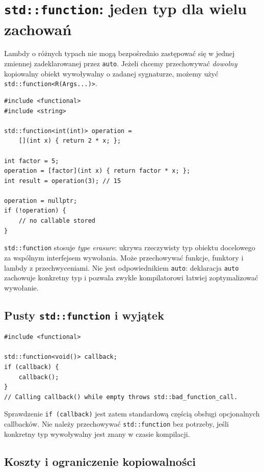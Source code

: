 \section{\texttt{std::function}: jeden typ dla wielu zachowań}
\label{sec:std-function}

Lambdy o różnych typach nie mogą bezpośrednio zastępować się w jednej
zmiennej zadeklarowanej przez \texttt{auto}. Jeżeli chcemy przechowywać
\emph{dowolny} kopiowalny obiekt wywoływalny o zadanej sygnaturze,
możemy użyć \texttt{std::function<R(Args...)>}.

\begin{lstlisting}
#include <functional>
#include <string>

std::function<int(int)> operation =
    [](int x) { return 2 * x; };

int factor = 5;
operation = [factor](int x) { return factor * x; };
int result = operation(3); // 15

operation = nullptr;
if (!operation) {
    // no callable stored
}
\end{lstlisting}

\texttt{std::function} stosuje \emph{type erasure}: ukrywa rzeczywisty
typ obiektu docelowego za wspólnym interfejsem wywołania. Może
przechowywać funkcje, funktory i lambdy z przechwyceniami. Nie jest
odpowiednikiem \texttt{auto}: deklaracja \texttt{auto} zachowuje
konkretny typ i pozwala zwykle kompilatorowi łatwiej zoptymalizować
wywołanie.

\subsection{Pusty \texttt{std::function} i wyjątek}

\begin{lstlisting}
#include <functional>

std::function<void()> callback;
if (callback) {
    callback();
}
// Calling callback() while empty throws std::bad_function_call.
\end{lstlisting}

Sprawdzenie \texttt{if (callback)} jest zatem standardową częścią
obsługi opcjonalnych callbacków. Nie należy przechowywać
\texttt{std::function} bez potrzeby, jeśli konkretny typ wywoływalny
jest znany w czasie kompilacji.

\subsection{Koszty i ograniczenie kopiowalności}

